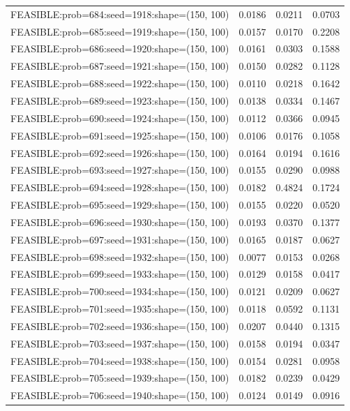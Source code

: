 \begin{longtable}{lccc}
FEASIBLE:prob=684:seed=1918:shape=(150, 100) & 0.0186 & 0.0211 & 0.0703 \\
FEASIBLE:prob=685:seed=1919:shape=(150, 100) & 0.0157 & 0.0170 & 0.2208 \\
FEASIBLE:prob=686:seed=1920:shape=(150, 100) & 0.0161 & 0.0303 & 0.1588 \\
FEASIBLE:prob=687:seed=1921:shape=(150, 100) & 0.0150 & 0.0282 & 0.1128 \\
FEASIBLE:prob=688:seed=1922:shape=(150, 100) & 0.0110 & 0.0218 & 0.1642 \\
FEASIBLE:prob=689:seed=1923:shape=(150, 100) & 0.0138 & 0.0334 & 0.1467 \\
FEASIBLE:prob=690:seed=1924:shape=(150, 100) & 0.0112 & 0.0366 & 0.0945 \\
FEASIBLE:prob=691:seed=1925:shape=(150, 100) & 0.0106 & 0.0176 & 0.1058 \\
FEASIBLE:prob=692:seed=1926:shape=(150, 100) & 0.0164 & 0.0194 & 0.1616 \\
FEASIBLE:prob=693:seed=1927:shape=(150, 100) & 0.0155 & 0.0290 & 0.0988 \\
FEASIBLE:prob=694:seed=1928:shape=(150, 100) & 0.0182 & 0.4824 & 0.1724 \\
FEASIBLE:prob=695:seed=1929:shape=(150, 100) & 0.0155 & 0.0220 & 0.0520 \\
FEASIBLE:prob=696:seed=1930:shape=(150, 100) & 0.0193 & 0.0370 & 0.1377 \\
FEASIBLE:prob=697:seed=1931:shape=(150, 100) & 0.0165 & 0.0187 & 0.0627 \\
FEASIBLE:prob=698:seed=1932:shape=(150, 100) & 0.0077 & 0.0153 & 0.0268 \\
FEASIBLE:prob=699:seed=1933:shape=(150, 100) & 0.0129 & 0.0158 & 0.0417 \\
FEASIBLE:prob=700:seed=1934:shape=(150, 100) & 0.0121 & 0.0209 & 0.0627 \\
FEASIBLE:prob=701:seed=1935:shape=(150, 100) & 0.0118 & 0.0592 & 0.1131 \\
FEASIBLE:prob=702:seed=1936:shape=(150, 100) & 0.0207 & 0.0440 & 0.1315 \\
FEASIBLE:prob=703:seed=1937:shape=(150, 100) & 0.0158 & 0.0194 & 0.0347 \\
FEASIBLE:prob=704:seed=1938:shape=(150, 100) & 0.0154 & 0.0281 & 0.0958 \\
FEASIBLE:prob=705:seed=1939:shape=(150, 100) & 0.0182 & 0.0239 & 0.0429 \\
FEASIBLE:prob=706:seed=1940:shape=(150, 100) & 0.0124 & 0.0149 & 0.0916 \\

\end{longtable}

